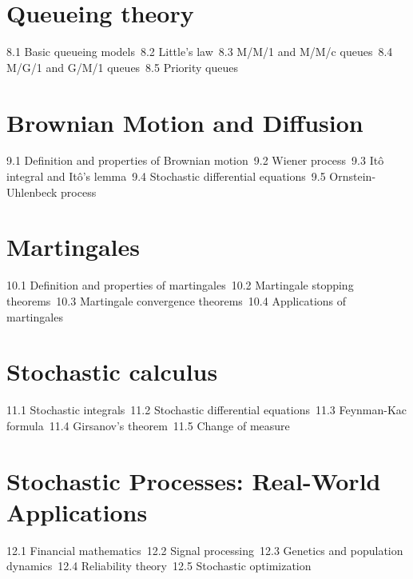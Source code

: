 \section{Queueing theory}
8.1 Basic queueing models\
8.2 Little's law\
8.3 M/M/1 and M/M/c queues\
8.4 M/G/1 and G/M/1 queues\
8.5 Priority queues\
\section{Brownian Motion and Diffusion}
9.1 Definition and properties of Brownian motion\
9.2 Wiener process\
9.3 Itô integral and Itô's lemma\
9.4 Stochastic differential equations\
9.5 Ornstein-Uhlenbeck process\
\section{Martingales}
10.1 Definition and properties of martingales\
10.2 Martingale stopping theorems\
10.3 Martingale convergence theorems\
10.4 Applications of martingales\
\section{Stochastic calculus}
11.1 Stochastic integrals\
11.2 Stochastic differential equations\
11.3 Feynman-Kac formula\
11.4 Girsanov's theorem\
11.5 Change of measure\
\section{Stochastic Processes: Real-World Applications}
12.1 Financial mathematics\
12.2 Signal processing\
12.3 Genetics and population dynamics\
12.4 Reliability theory\
12.5 Stochastic optimization\

